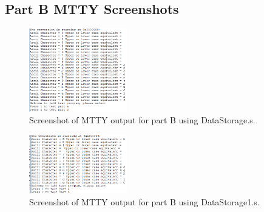 \documentclass[10pt, letterpaper, titlepage]{article} %
\begin{document}
\subsection{Part B MTTY Screenshots}
\begin{figure}[H]
   \includegraphics[width=0.38\textwidth]{PartB_1.png}
   \centering  
   \caption{Screenshot of MTTY output for part B using DataStorage.s.} 
   \label{figure:5}
\end{figure}

\begin{figure}[H]
   \includegraphics[width=0.38\textwidth]{PartB_2.png}
   \centering  
   \caption{Screenshot of MTTY output for part B using DataStorage1.s.} 
   \label{figure:6}
\end{figure}
\end{document}
